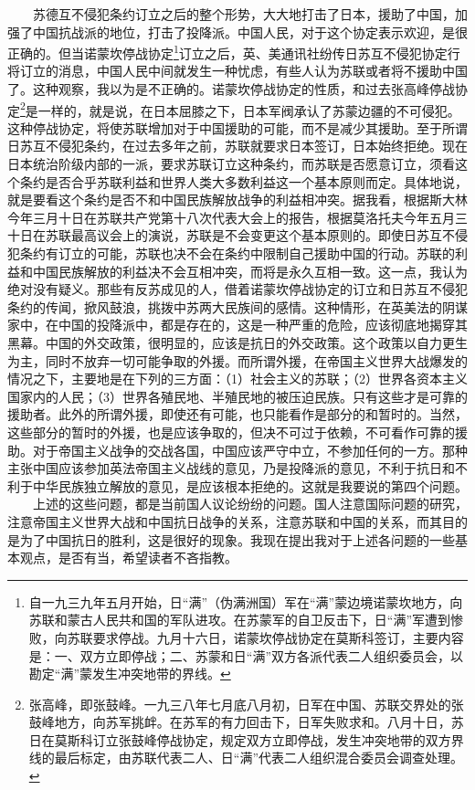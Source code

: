 \documentclass[cn,11pt,chinese]{elegantbook}
\begin{document}
　　苏德互不侵犯条约订立之后的整个形势，大大地打击了日本，援助了中国，加强了中国抗战派的地位，打击了投降派。中国人民，对于这个协定表示欢迎，是很正确的。但当诺蒙坎停战协定\footnote[10]{ 自一九三九年五月开始，日“满”（伪满洲国）军在“满”蒙边境诺蒙坎地方，向苏联和蒙古人民共和国的军队进攻。在苏蒙军的自卫反击下，日“满”军遭到惨败，向苏联要求停战。九月十六日，诺蒙坎停战协定在莫斯科签订，主要内容是：一、双方立即停战；二、苏蒙和日“满”双方各派代表二人组织委员会，以勘定“满”蒙发生冲突地带的界线。}订立之后，英、美通讯社纷传日苏互不侵犯协定行将订立的消息，中国人民中间就发生一种忧虑，有些人认为苏联或者将不援助中国了。这种观察，我以为是不正确的。诺蒙坎停战协定的性质，和过去张高峰停战协定\footnote[11]{ 张高峰，即张鼓峰。一九三八年七月底八月初，日军在中国、苏联交界处的张鼓峰地方，向苏军挑衅。在苏军的有力回击下，日军失败求和。八月十日，苏日在莫斯科订立张鼓峰停战协定，规定双方立即停战，发生冲突地带的双方界线的最后标定，由苏联代表二人、日“满”代表二人组织混合委员会调查处理。}是一样的，就是说，在日本屈膝之下，日本军阀承认了苏蒙边疆的不可侵犯。这种停战协定，将使苏联增加对于中国援助的可能，而不是减少其援助。至于所谓日苏互不侵犯条约，在过去多年之前，苏联就要求日本签订，日本始终拒绝。现在日本统治阶级内部的一派，要求苏联订立这种条约，而苏联是否愿意订立，须看这个条约是否合乎苏联利益和世界人类大多数利益这一个基本原则而定。具体地说，就是要看这个条约是否不和中国民族解放战争的利益相冲突。据我看，根据斯大林今年三月十日在苏联共产党第十八次代表大会上的报告，根据莫洛托夫今年五月三十日在苏联最高议会上的演说，苏联是不会变更这个基本原则的。即使日苏互不侵犯条约有订立的可能，苏联也决不会在条约中限制自己援助中国的行动。苏联的利益和中国民族解放的利益决不会互相冲突，而将是永久互相一致。这一点，我认为绝对没有疑义。那些有反苏成见的人，借着诺蒙坎停战协定的订立和日苏互不侵犯条约的传闻，掀风鼓浪，挑拨中苏两大民族间的感情。这种情形，在英美法的阴谋家中，在中国的投降派中，都是存在的，这是一种严重的危险，应该彻底地揭穿其黑幕。中国的外交政策，很明显的，应该是抗日的外交政策。这个政策以自力更生为主，同时不放弃一切可能争取的外援。而所谓外援，在帝国主义世界大战爆发的情况之下，主要地是在下列的三方面：（1）社会主义的苏联；（2）世界各资本主义国家内的人民；（3）世界各殖民地、半殖民地的被压迫民族。只有这些才是可靠的援助者。此外的所谓外援，即使还有可能，也只能看作是部分的和暂时的。当然，这些部分的暂时的外援，也是应该争取的，但决不可过于依赖，不可看作可靠的援助。对于帝国主义战争的交战各国，中国应该严守中立，不参加任何的一方。那种主张中国应该参加英法帝国主义战线的意见，乃是投降派的意见，不利于抗日和不利于中华民族独立解放的意见，是应该根本拒绝的。这就是我要说的第四个问题。\\
　　上述的这些问题，都是当前国人议论纷纷的问题。国人注意国际问题的研究，注意帝国主义世界大战和中国抗日战争的关系，注意苏联和中国的关系，而其目的是为了中国抗日的胜利，这是很好的现象。我现在提出我对于上述各问题的一些基本观点，是否有当，希望读者不吝指教。\\
\end{document}
